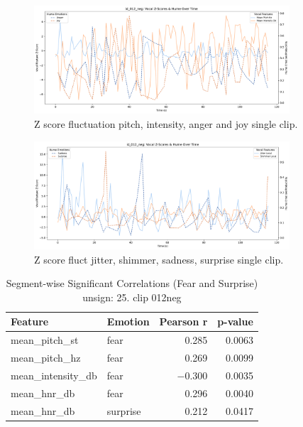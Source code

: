 \begin{figure}[H]
    \centering 
    \includegraphics[width=0.85\textwidth]{png/results/rq1_new/012_neg_use-anger-joy.pdf}
    \caption{Z score fluctuation pitch, intensity, anger and joy single clip.}
    \label{fig:z-score-ang-joy-012}
\end{figure}

\begin{figure}[H]
    \centering 
    \includegraphics[width=0.85\textwidth]{png/results/rq1_new/012_neg_use-sadn-surp.pdf}
    \caption{Z score fluct jitter, shimmer, sadness, surprise single clip.}
    \label{fig:z-score-surp-sadn-012}
\end{figure}


  \begin{table}[H]
    \centering 
    \begin{tabular}{llrr}
      \toprule
      \textbf{Feature}         & \textbf{Emotion} & \textbf{Pearson r} & \textbf{p-value} \\
      \midrule
      mean\_pitch\_st          & fear             & 0.285              & 0.0063           \\
      mean\_pitch\_hz          & fear             & 0.269              & 0.0099           \\
      mean\_intensity\_db      & fear             & $-0.300$           & 0.0035           \\
      mean\_hnr\_db            & fear             & 0.296              & 0.0040           \\
      mean\_hnr\_db            & surprise         & 0.212              & 0.0417           \\
      \bottomrule
    \end{tabular}
    \caption{Segment-wise Significant Correlations (Fear and Surprise) unsign: 25. clip 012neg}
    \label{tab:segcorr_fear_012}
  \end{table}
  

